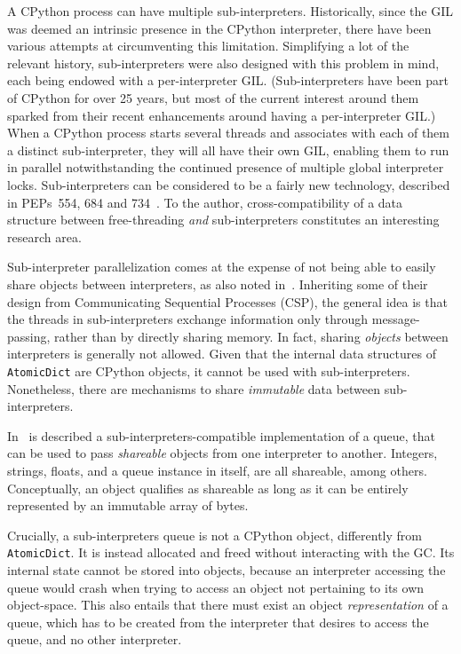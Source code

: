 A CPython process can have multiple sub-interpreters.
Historically, since the GIL was deemed an intrinsic presence in the CPython interpreter, there have been various attempts at circumventing this limitation.
Simplifying a lot of the relevant history, sub-interpreters were also designed with this problem in mind, each being endowed with a per-interpreter GIL\@.
(Sub-interpreters have been part of CPython for over 25 years, but most of the current interest around them sparked from their recent enhancements around having a per-interpreter GIL\@.)
When a CPython process starts several threads and associates with each of them a distinct sub-interpreter, they will all have their own GIL, enabling them to run in parallel notwithstanding the continued presence of multiple global interpreter locks.
Sub-interpreters can be considered to be a fairly new technology, described in PEPs~554, 684 and 734~\cite{pep554,pep684,pep734}.
To the author, cross-compatibility of a data structure between free-threading \emph{and} sub-interpreters constitutes an interesting research area.

Sub-interpreter parallelization comes at the expense of not being able to easily share objects between interpreters, as also noted in~\cite[{\S}Per-Interpreter GIL]{pep703}.
Inheriting some of their design from Communicating Sequential Processes (CSP), the general idea is that the threads in sub-interpreters exchange information only through message-passing, rather than by directly sharing memory.
In fact, sharing \emph{objects} between interpreters is generally not allowed.
Given that the internal data structures of \texttt{AtomicDict} are CPython objects, it cannot be used with sub-interpreters.
Nonetheless, there are mechanisms to share \emph{immutable} data between sub-interpreters.

In~\cite[\S Queue Objects]{pep734} is described a sub-interpreters-compatible implementation of a queue, that can be used to pass \emph{shareable} objects from one interpreter to another.
Integers, strings, floats, and a queue instance in itself, are all shareable, among others.
Conceptually, an object qualifies as shareable as long as it can be entirely represented by an immutable array of bytes.

Crucially, a sub-interpreters queue is not a CPython object, differently from \texttt{AtomicDict}.
It is instead allocated and freed without interacting with the GC\@.
Its internal state cannot be stored into objects, because an interpreter accessing the queue would crash when trying to access an object not pertaining to its own object-space.
This also entails that there must exist an object \emph{representation} of a queue, which has to be created from the interpreter that desires to access the queue, and no other interpreter.

